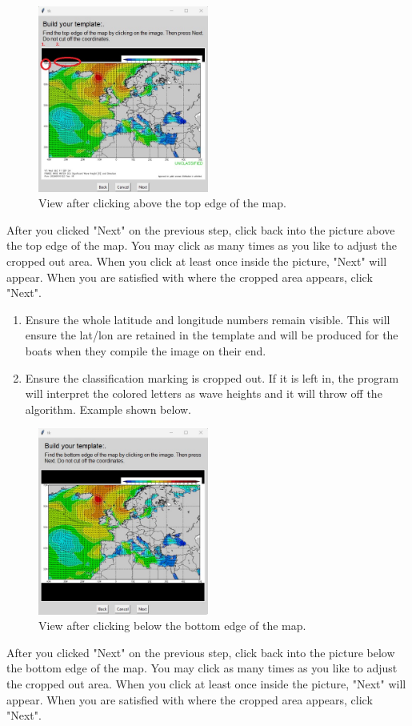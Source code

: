 \begin{figure}[H]
    \centering\includegraphics[width=0.5\textwidth]{TeX/Build_Template4.jpg}
    \caption{View after clicking above the top edge of the map.}
\end{figure}
After you clicked "Next" on the previous step, click back into the picture above the top edge of the map. You may click as many times as you like to adjust the cropped out area. When you click at least once inside the picture, "Next" will appear. When you  are satisfied with where the cropped area appears, click "Next".
\begin{enumerate}
    \item Ensure the whole latitude and longitude numbers remain visible.  This will ensure the lat/lon are retained in the template and will be produced for the boats when they compile the image on their end.
    \item Ensure the classification marking is cropped out. If it is left in, the program will interpret the colored letters as wave heights and it will throw off the algorithm. Example shown below.
\end{enumerate}

\begin{figure}[H]
    \centering\includegraphics[width=0.5\textwidth]{TeX/Build_Template5.jpg}
    \caption{View after clicking below the bottom edge of the map.}
\end{figure}
After you clicked "Next" on the previous step, click back into the picture below the bottom edge of the map. You may click as many times as you like to adjust the cropped out area. When you click at least once inside the picture, "Next" will appear. When you  are satisfied with where the cropped area appears, click "Next".

